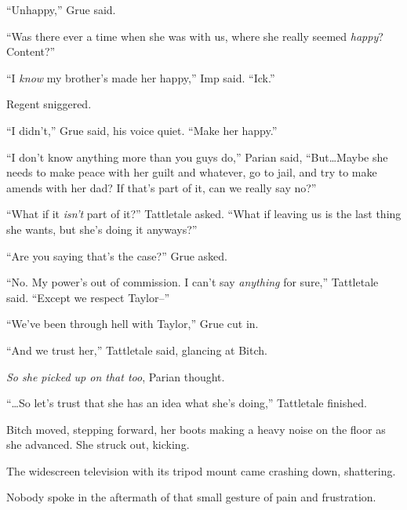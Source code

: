 ``Unhappy,'' Grue said.



``Was there ever a time when she was with us, where she really seemed \emph{happy}?  Content?''



``I \emph{know }my brother's made her happy,'' Imp said.  ``Ick.''



Regent sniggered.



``I didn't,'' Grue said, his voice quiet.  ``Make her happy.''



``I don't know anything more than you guys do,'' Parian said, ``But\ldots{}Maybe she needs to make peace with her guilt and whatever, go to jail, and try to make amends with her dad?  If that's part of it, can we really say no?''



``What if it \emph{isn't }part of it?'' Tattletale asked.  ``What if leaving us is the last thing she wants, but she's doing it anyways?''



``Are you saying that's the case?'' Grue asked.



``No.  My power's out of commission.  I can't say \emph{anything} for sure,'' Tattletale said.  ``Except we respect Taylor--''



``We've been through hell with Taylor,'' Grue cut in.



``And we trust her,'' Tattletale said, glancing at Bitch.



\emph{So she picked up on that too}, Parian thought.



``\ldots{}So let's trust that she has an idea what she's doing,'' Tattletale finished.



Bitch moved, stepping forward, her boots making a heavy noise on the floor as she advanced.  She struck out, kicking.



The widescreen television with its tripod mount came crashing down, shattering.



Nobody spoke in the aftermath of that small gesture of pain and frustration.



